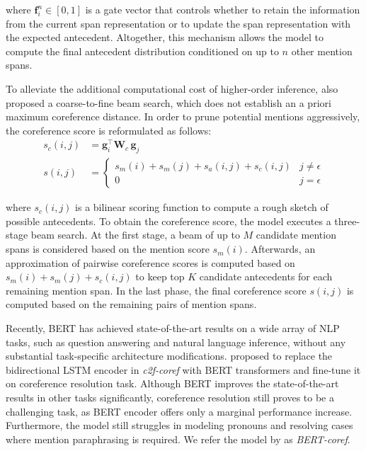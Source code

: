 \documentclass[11pt]{article}
\begin{document}
where $\pmb{f}_{i}^{n} \in [0,1]$ is a gate vector that controls whether to retain the information from the current span representation or to update the span representation with the expected antecedent. Altogether, this mechanism allows the model to compute the final antecedent distribution conditioned on up to $n$ other mention spans. 

To alleviate the additional computational cost of higher-order inference, \textcite{lee2018higher} also proposed a coarse-to-fine beam search, which does not establish an a priori maximum coreference distance. In order to prune potential mentions aggressively, the coreference score is reformulated as follows:
\begin{align}
s_{c}(i, j) &= \pmb{g}_{i}^{\top}\textbf{W}_{c}\, \pmb{g}_{j}\\
s(i, j) &= \begin{cases}
s_{m}(i) + s_{m}(j) + s_{a}(i, j) + s_{c}(i, j) & j \neq \epsilon \\
0 & j = \epsilon
\end{cases}
\end{align}

where $s_{c}(i, j)$ is a bilinear scoring function to compute a rough sketch of possible antecedents. To obtain the coreference score, the model executes a three-stage beam search. At the first stage, a beam of up to $M$ candidate mention spans is considered based on the mention score $s_{m}(i)$. Afterwards, an approximation of pairwise coreference scores is computed based on $s_{m}(i) + s_{m}(j) + s_{c}(i, j)$ to keep top $K$ candidate antecedents for each remaining mention span. In the last phase, the final coreference score $s(i, j)$ is computed based on the remaining pairs of mention spans.

Recently, BERT \parencite{devlin2019bert} has achieved state-of-the-art results on a wide array of NLP tasks, such as question answering and natural language inference, without any substantial task-specific architecture modifications. \textcite{joshi2019coref} proposed to replace the bidirectional LSTM encoder in \textit{c2f-coref} with BERT transformers and fine-tune it on coreference resolution task. Although BERT improves the state-of-the-art results in other tasks significantly, coreference resolution still proves to be a challenging task, as BERT encoder offers only a marginal performance increase. Furthermore, the model still struggles in modeling pronouns and resolving cases where mention paraphrasing is required. We refer the model by \textcite{joshi2019coref} as \textit{BERT-coref}.
\end{document}
